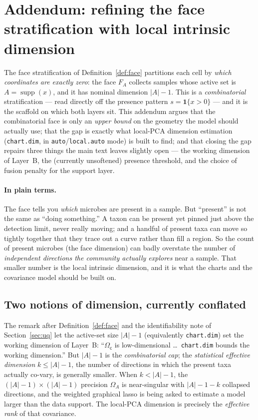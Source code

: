 \documentclass[11pt]{article}
\theoremstyle{definition}
\theoremstyle{plain}
\theoremstyle{remark}
\newcommand{\supp}{\operatorname{supp}}
\newcommand{\1}{\mathbf{1}}
\newcommand{\Prec}{\Omega}
\newcommand{\cc}{\mathsf{c}}              %
\newcommand{\abs}[1]{\lvert #1 \rvert}
\begin{document}
\section{Addendum: refining the face stratification with local intrinsic
  dimension}\label{sec:addendum}

The face stratification of Definition~\ref{def:face} partitions each cell by
\emph{which coordinates are exactly zero}: the face $F_A$ collects samples whose
active set is $A=\supp(x)$, and it has nominal dimension $\abs{A}-1$. This is a
\emph{combinatorial} stratification --- read directly off the presence pattern
$s=\1\{x>0\}$ --- and it is the scaffold on which both layers sit. This addendum
argues that the combinatorial face is only an \emph{upper bound} on the geometry
the model should actually use; that the gap is exactly what local-PCA dimension
estimation (\texttt{chart.dim}, in \texttt{auto}/\texttt{local.auto} mode) is
built to find; and that closing the gap repairs three things the main text leaves
slightly open --- the working dimension of Layer~B, the (currently unsoftened)
presence threshold, and the choice of fusion penalty for the support layer.

\paragraph{In plain terms.}
The face tells you \emph{which} microbes are present in a sample. But ``present''
is not the same as ``doing something.'' A taxon can be present yet pinned just
above the detection limit, never really moving; and a handful of present taxa can
move so tightly together that they trace out a curve rather than fill a region.
So the count of present microbes (the face dimension) can badly overstate the
number of \emph{independent directions the community actually explores} near a
sample. That smaller number is the local intrinsic dimension, and it is what the
charts and the covariance model should be built on.

\subsection{Two notions of dimension, currently conflated}
\label{sec:twodim}

The remark after Definition~\ref{def:face} and the identifiability note of
Section~\ref{sec:uq} let the active-set size $\abs{A}-1$ (equivalently
\texttt{chart.dim}) set the working dimension of Layer~B: ``$\Prec_\cc$ is
low-dimensional \dots\ \texttt{chart.dim} bounds the working dimension.'' But
$\abs{A}-1$ is the \emph{combinatorial cap}; the \emph{statistical effective
dimension} $k\le\abs{A}-1$, the number of directions in which the present taxa
actually co-vary, is generally smaller. When $k<\abs{A}-1$, the
$(\abs{A}-1)\times(\abs{A}-1)$ precision $\Prec_A$ is near-singular with
$\abs{A}-1-k$ collapsed directions, and the weighted graphical lasso is being
asked to estimate a model larger than the data support. The local-PCA dimension
is precisely the \emph{effective rank} of that covariance.
\end{document}
